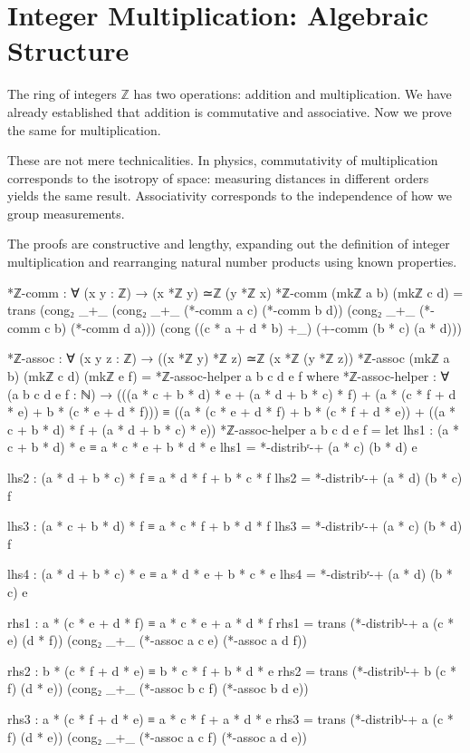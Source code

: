 \documentclass[11pt,a4paper]{book}
\begin{document}
\section{Integer Multiplication: Algebraic Structure}

The ring of integers $\mathbb{Z}$ has two operations: addition and multiplication. 
We have already established that addition is commutative and associative. 
Now we prove the same for multiplication.

These are not mere technicalities. In physics, commutativity of multiplication corresponds to the isotropy of space: measuring distances in different orders yields the same result.
Associativity corresponds to the independence of how we group measurements.

The proofs are constructive and lengthy, expanding out the definition of integer multiplication and rearranging natural number products using known properties.

\begin{code}
*ℤ-comm : ∀ (x y : ℤ) → (x *ℤ y) ≃ℤ (y *ℤ x)
*ℤ-comm (mkℤ a b) (mkℤ c d) = 
  trans (cong₂ _+_ (cong₂ _+_ (*-comm a c) (*-comm b d)) 
                   (cong₂ _+_ (*-comm c b) (*-comm d a)))
        (cong ((c * a + d * b) +_) (+-comm (b * c) (a * d)))

*ℤ-assoc : ∀ (x y z : ℤ) → ((x *ℤ y) *ℤ z) ≃ℤ (x *ℤ (y *ℤ z))
*ℤ-assoc (mkℤ a b) (mkℤ c d) (mkℤ e f) =
  *ℤ-assoc-helper a b c d e f
  where
    *ℤ-assoc-helper : ∀ (a b c d e f : ℕ) →
      (((a * c + b * d) * e + (a * d + b * c) * f) + (a * (c * f + d * e) + b * (c * e + d * f)))
      ≡ ((a * (c * e + d * f) + b * (c * f + d * e)) + ((a * c + b * d) * f + (a * d + b * c) * e))
    *ℤ-assoc-helper a b c d e f = 
      let 
        lhs1 : (a * c + b * d) * e ≡ a * c * e + b * d * e
        lhs1 = *-distribʳ-+ (a * c) (b * d) e
        
        lhs2 : (a * d + b * c) * f ≡ a * d * f + b * c * f
        lhs2 = *-distribʳ-+ (a * d) (b * c) f
        
        lhs3 : (a * c + b * d) * f ≡ a * c * f + b * d * f
        lhs3 = *-distribʳ-+ (a * c) (b * d) f
        
        lhs4 : (a * d + b * c) * e ≡ a * d * e + b * c * e
        lhs4 = *-distribʳ-+ (a * d) (b * c) e
        
        rhs1 : a * (c * e + d * f) ≡ a * c * e + a * d * f
        rhs1 = trans (*-distribˡ-+ a (c * e) (d * f)) (cong₂ _+_ (*-assoc a c e) (*-assoc a d f))
        
        rhs2 : b * (c * f + d * e) ≡ b * c * f + b * d * e
        rhs2 = trans (*-distribˡ-+ b (c * f) (d * e)) (cong₂ _+_ (*-assoc b c f) (*-assoc b d e))
        
        rhs3 : a * (c * f + d * e) ≡ a * c * f + a * d * e
        rhs3 = trans (*-distribˡ-+ a (c * f) (d * e)) (cong₂ _+_ (*-assoc a c f) (*-assoc a d e))
\end{code}
\end{document}
